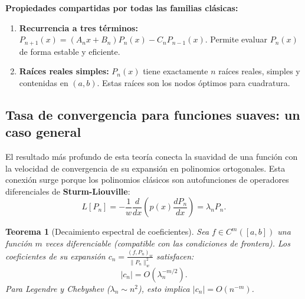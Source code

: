 \documentclass[a4paper,11pt]{report}
\newtheorem{theorem}{Teorema}[chapter]
\begin{document}
\textbf{Propiedades compartidas por todas las familias clásicas:}
\begin{enumerate}
\item \textbf{Recurrencia a tres términos:} $P_{n+1}(x) = (A_n x + B_n) P_n(x) - C_n P_{n-1}(x)$. Permite evaluar $P_n(x)$ de forma estable y eficiente.
\item \textbf{Raíces reales simples:} $P_n(x)$ tiene exactamente $n$ raíces reales, simples y contenidas en $(a,b)$. Estas raíces son los nodos óptimos para cuadratura.
\end{enumerate}

\subsection{Tasa de convergencia para funciones suaves: un caso general}

El resultado más profundo de esta teoría conecta la suavidad de una función con la velocidad de convergencia de su expansión en polinomios ortogonales. Esta conexión surge porque los polinomios clásicos son autofunciones de operadores diferenciales de \textbf{Sturm-Liouville}:
\[
L[P_n] = -\frac{1}{w} \frac{d}{dx}\left( p(x) \frac{dP_n}{dx} \right) = \lambda_n P_n.
\]

\begin{theorem}[Decaimiento espectral de coeficientes]
Sea $f \in C^m([a,b])$ una función $m$ veces diferenciable (compatible con las condiciones de frontera). Los coeficientes de su expansión $c_n = \frac{(f, P_n)_w}{\|P_n\|_w^2}$ satisfacen:
\[
|c_n| = O(\lambda_n^{-m/2}).
\]
Para Legendre y Chebyshev ($\lambda_n \sim n^2$), esto implica $|c_n| = O(n^{-m})$.
\end{theorem}
\end{document}
